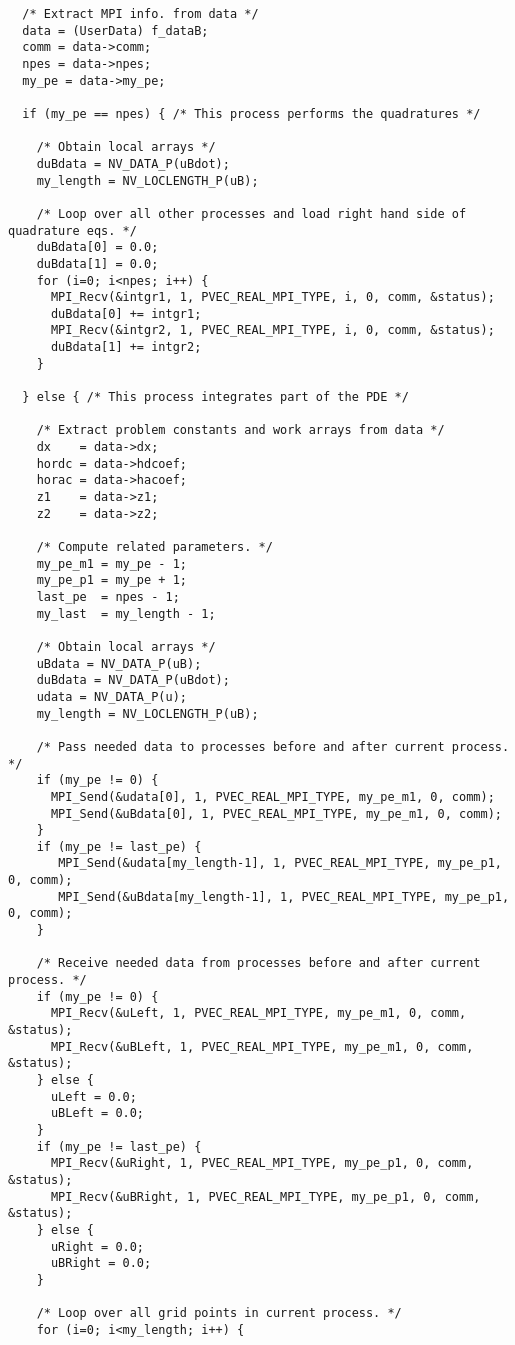 \begin{verbatim}
  /* Extract MPI info. from data */
  data = (UserData) f_dataB;
  comm = data->comm;
  npes = data->npes;
  my_pe = data->my_pe;

  if (my_pe == npes) { /* This process performs the quadratures */

    /* Obtain local arrays */
    duBdata = NV_DATA_P(uBdot);
    my_length = NV_LOCLENGTH_P(uB);

    /* Loop over all other processes and load right hand side of quadrature eqs. */
    duBdata[0] = 0.0;
    duBdata[1] = 0.0;
    for (i=0; i<npes; i++) {
      MPI_Recv(&intgr1, 1, PVEC_REAL_MPI_TYPE, i, 0, comm, &status); 
      duBdata[0] += intgr1;
      MPI_Recv(&intgr2, 1, PVEC_REAL_MPI_TYPE, i, 0, comm, &status); 
      duBdata[1] += intgr2;
    }

  } else { /* This process integrates part of the PDE */

    /* Extract problem constants and work arrays from data */
    dx    = data->dx;
    hordc = data->hdcoef;
    horac = data->hacoef;
    z1    = data->z1;
    z2    = data->z2;

    /* Compute related parameters. */
    my_pe_m1 = my_pe - 1;
    my_pe_p1 = my_pe + 1;
    last_pe  = npes - 1;
    my_last  = my_length - 1;
    
    /* Obtain local arrays */
    uBdata = NV_DATA_P(uB);
    duBdata = NV_DATA_P(uBdot);
    udata = NV_DATA_P(u);
    my_length = NV_LOCLENGTH_P(uB);

    /* Pass needed data to processes before and after current process. */
    if (my_pe != 0) {
      MPI_Send(&udata[0], 1, PVEC_REAL_MPI_TYPE, my_pe_m1, 0, comm);
      MPI_Send(&uBdata[0], 1, PVEC_REAL_MPI_TYPE, my_pe_m1, 0, comm);
    }
    if (my_pe != last_pe) {
       MPI_Send(&udata[my_length-1], 1, PVEC_REAL_MPI_TYPE, my_pe_p1, 0, comm);
       MPI_Send(&uBdata[my_length-1], 1, PVEC_REAL_MPI_TYPE, my_pe_p1, 0, comm);
    }
    
    /* Receive needed data from processes before and after current process. */
    if (my_pe != 0) {
      MPI_Recv(&uLeft, 1, PVEC_REAL_MPI_TYPE, my_pe_m1, 0, comm, &status);
      MPI_Recv(&uBLeft, 1, PVEC_REAL_MPI_TYPE, my_pe_m1, 0, comm, &status);
    } else {
      uLeft = 0.0;
      uBLeft = 0.0;
    }
    if (my_pe != last_pe) {
      MPI_Recv(&uRight, 1, PVEC_REAL_MPI_TYPE, my_pe_p1, 0, comm, &status);
      MPI_Recv(&uBRight, 1, PVEC_REAL_MPI_TYPE, my_pe_p1, 0, comm, &status);
    } else {
      uRight = 0.0;
      uBRight = 0.0;
    }

    /* Loop over all grid points in current process. */
    for (i=0; i<my_length; i++) {
      

\end{verbatim}

